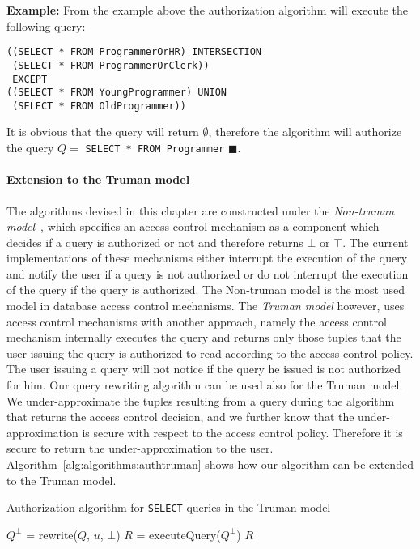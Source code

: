 \smallskip
\noindent
{\bf Example:}
From the example above the authorization algorithm will execute the following query:
\begin{verbatim}
((SELECT * FROM ProgrammerOrHR) INTERSECTION
 (SELECT * FROM ProgrammerOrClerk))
 EXCEPT
((SELECT * FROM YoungProgrammer) UNION
 (SELECT * FROM OldProgrammer))
\end{verbatim}
\noindent
It is obvious that the query will return $\emptyset$, therefore the algorithm will authorize the query $Q = $ \texttt{SELECT * FROM Programmer} $\blacksquare$.

\paragraph{Extension to the Truman model}

The algorithms devised in this chapter are constructed under the \emph{Non-truman model}~\cite{rizvi2004extending}, which specifies an access control mechanism as a component which decides if a query is authorized or not and therefore returns $\bot$ or $\top$.
%
The current implementations of these mechanisms either interrupt the execution of the query and notify the user if a query is not authorized or do not interrupt the execution of the query if the query is authorized.
%
The Non-truman model is the most used model in database access control mechanisms.
%
The \emph{Truman model} however, uses access control mechanisms with another approach, namely the access control mechanism internally executes the query and returns only those tuples that the user issuing the query is authorized to read according to the access control policy.
%
The user issuing a query will not notice if the query he issued is not authorized for him.
%
Our query rewriting algorithm can be used also for the Truman model.
%
We under-approximate the tuples resulting from a query during the algorithm that returns the access control decision, and we further know that the under-approximation is secure with respect to the access control policy.
%
Therefore it is secure to return the under-approximation to the user.
%
Algorithm~\ref{alg:algorithms:authtruman} shows how our algorithm can be extended to the Truman model.
%
\begin{algorithm}
\caption{Authorization algorithm for \texttt{SELECT} queries in the Truman model}
\label{alg:algorithms:authtruman}
	\SetAlgoLined
	$Q^\bot$ = rewrite($Q$, $u$, $\bot$)\;
	$R$ = executeQuery($Q^\bot$)\;
	\Return $R$

\end{algorithm}
